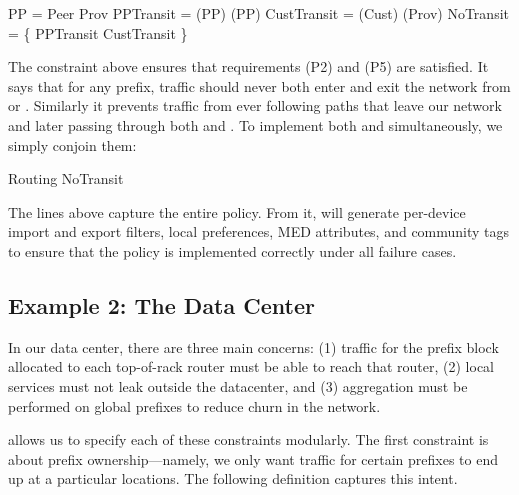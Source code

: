 
\begin{code}
\Define PP = Peer \OR Prov
\Define PPTransit   = \Enter(PP) \AND \Exit(PP)
\Define CustTransit = \Later(Cust) \AND \Later(Prov)
\Define NoTransit   = \{
    \True \Path \NOT{}PPTransit \AND \NOT{}CustTransit
\}
\end{code}
\noindent
The  constraint above ensures that requirements (P2) and (P5) are satisfied. It says that for any prefix, traffic should never both enter and exit the network from  or . Similarly it prevents traffic from ever following paths that leave our network and later passing through both  and .  To implement both 
and  simultaneously, we simply conjoin them:


\begin{code}
Routing \AND{} NoTransit
\end{code}

\noindent
The lines above capture the entire policy. From it, \sysname will generate per-device import and export filters, local preferences,
MED attributes, and community tags to ensure that the policy is
implemented correctly under all failure cases.

\subsection{Example 2: The Data Center}

In our data center,
there are three main concerns:
(1) traffic for the prefix block allocated to each top-of-rack router must be able to reach that router,
(2) local services must not leak outside the datacenter, and
(3) aggregation must be performed on global prefixes to reduce churn
in the network.

\sysname allows us to specify each of these constraints modularly. The first constraint is about prefix ownership---namely, we only want traffic for certain prefixes to end up at a particular locations. The following definition captures this intent.

